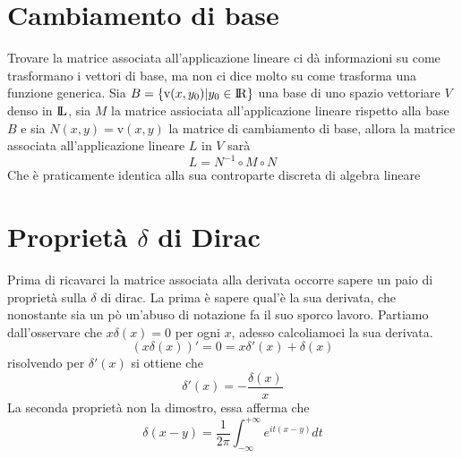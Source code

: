 \documentclass[11pt,a4paper]{report}
\newcommand{\vettorec}[1]{\textrm{#1}}
\theoremstyle{definition}
\theoremstyle{plain}
\theoremstyle{plain}
\begin{document}
		\section{Cambiamento di base}
			Trovare la matrice associata all'applicazione lineare ci dà informazioni su come trasformano i vettori di base, ma non ci dice molto su come trasforma una funzione generica.\newline
			Sia $B=\{\vettorec v(x,y_0)|y_0\in \rm I\!R\}$ una base di uno spazio vettoriare $V$ denso in $\rm I\!L$, sia $M$ la matrice assiociata all'applicazione lineare rispetto alla base $B$ e sia $N(x,y)=\vettorec v(x,y)$ la matrice di cambiamento di base, allora la matrice associata all'applicazione lineare $L$ in $V$ sarà
			\begin{equation}
				L=N^{-1}\circ M \circ N
			\end{equation}
			Che è praticamente identica alla sua controparte discreta di algebra lineare



		\section{Proprietà $\delta$ di Dirac}
			Prima di ricavarci la matrice associata alla derivata occorre sapere un paio di proprietà sulla $\delta$ di dirac.\newline
			La prima è sapere qual'è la sua derivata, che nonostante sia un pò un'abuso di notazione fa il suo sporco lavoro. Partiamo dall'osservare che $x\delta (x)=0$ per ogni $x$, adesso calcoliamoci la sua derivata.
			\[
				(x\delta (x))'=0= x\delta'(x) + \delta(x)
			\]
			risolvendo per $\delta'(x)$ si ottiene che 
			\begin{equation}
				\delta'(x)=-\frac{\delta(x)}{x}
			\end{equation}
			La seconda proprietà non la dimostro, essa afferma che
			\begin{equation}
				\delta(x-y)=\frac{1}{2\pi} \int_{-\infty}^{+\infty} e^{it(x-y)} dt
			\end{equation}
\end{document}
